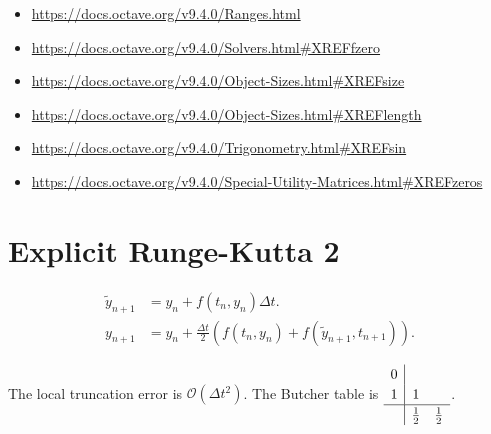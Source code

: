 \begin{itemize}
	\item

	      \url{https://docs.octave.org/v9.4.0/Ranges.html}

	\item

	      \url{https://docs.octave.org/v9.4.0/Solvers.html#XREFfzero}

	\item

	      \url{https://docs.octave.org/v9.4.0/Object-Sizes.html#XREFsize}

	\item

	      \url{https://docs.octave.org/v9.4.0/Object-Sizes.html#XREFlength}

	\item

	      \url{https://docs.octave.org/v9.4.0/Trigonometry.html#XREFsin}

	\item

	      \url{https://docs.octave.org/v9.4.0/Special-Utility-Matrices.html#XREFzeros}
\end{itemize}


\section{Explicit Runge-Kutta 2}
\begin{align*}
	\widetilde{y}_{n+1} & =
	y_{n}+
	f\left(t_{n},y_{n}\right)\Delta t. \\
	y_{n+1}             & =
	y_{n}+
	\frac{\Delta t}{2}
	\left(
	f\left(t_{n},y_{n}\right)+
	f\left(\widetilde{y}_{n+1},t_{n+1}\right)
	\right).
\end{align*}

The local truncation error is
\begin{math}
	\mathcal{O}
	\left(\Delta t^{2}\right)
\end{math}.
The Butcher table is
\begin{math}
	\renewcommand\arraystretch{1.2}
	\begin{array}
		{c|cc}
		0 &             &             \\
		1 & 1           &             \\
		\hline
		  & \frac{1}{2} & \frac{1}{2}
	\end{array}
\end{math}.

